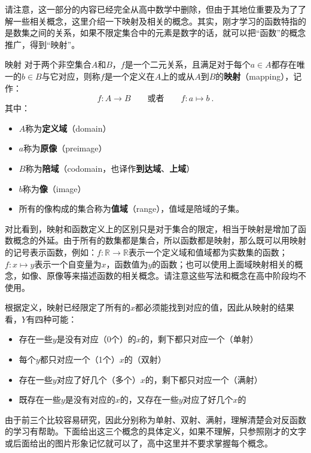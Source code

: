 请注意，这一部分的内容已经完全从高中数学中删除，但由于其地位重要及为了了解一些相关概念，这里介绍一下映射及相关的概念。其实，刚才学习的函数特指的是数集之间的关系，如果不限定集合中的元素是数字的话，就可以把“函数”的概念推广，得到“映射”。

\begin{definition}{映射}
对于两个非空集合$A$和$B$，$f$是一个二元关系，且满足对于每个$a\in A$都存在唯一的$b\in B$与它对应，则称$f$是一个定义在$A$上的或从$A$到$B$的\textbf{映射}（mapping），记作：
\begin{equation}
f:A\to B\qquad\text{或者}\qquad f:a\mapsto b~.
\end{equation}
其中：
\begin{itemize}
\item $A$称为\textbf{定义域}（domain）
\item $a$称为\textbf{原像}（preimage）
\item $B$称为\textbf{陪域}（codomain，也译作\textbf{到达域}、\textbf{上域}）
\item $b$称为\textbf{像}（image）
\item 所有的像构成的集合称为\textbf{值域}（range），值域是陪域的子集。
\end{itemize}
\end{definition}

对比看到，映射和函数定义上的区别只是对于集合的限定，相当于映射是增加了函数概念的外延。由于所有的数集都是集合，所以函数都是映射，那么既可以用映射的记号表示函数，例如：$f: \mathbb R \to \mathbb R$表示一个定义域和值域都为实数集的函数；$f:x \mapsto y$表示一个自变量为$x$，函数值为$y$的函数；也可以使用上面域映射相关的概念，如像、原像等来描述函数的相关概念。请注意这些写法和概念在高中阶段均不使用。

根据定义，映射已经限定了所有的$x$都必须能找到对应的值，因此从映射的结果看，$Y$有四种可能：
\begin{itemize}
\item 存在一些$y$是没有对应（0个）的$x$的，剩下都只对应一个（单射）
\item 每个$y$都只对应一个（1个）$x$的（双射）
\item 存在一些$y$对应了好几个（多个）$x$的，剩下都只对应一个（满射）
\item 既存在一些$y$是没有对应的$x$的，又存在一些$y$对应了好几个$x$的
\end{itemize}

由于前三个比较容易研究，因此分别称为单射、双射、满射，理解清楚会对反函数的学习有帮助。下面给出这三个概念的具体定义，如果不理解，只参照刚才的文字或后面给出的图片形象记忆就可以了，高中这里并不要求掌握每个概念。

